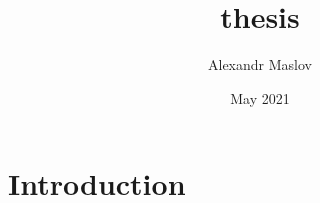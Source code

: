 \documentclass{article}
\title{thesis}
\author{Alexandr Maslov}
\date{May 2021}
\begin{document}
\maketitle

\section{Introduction}
\end{document}
